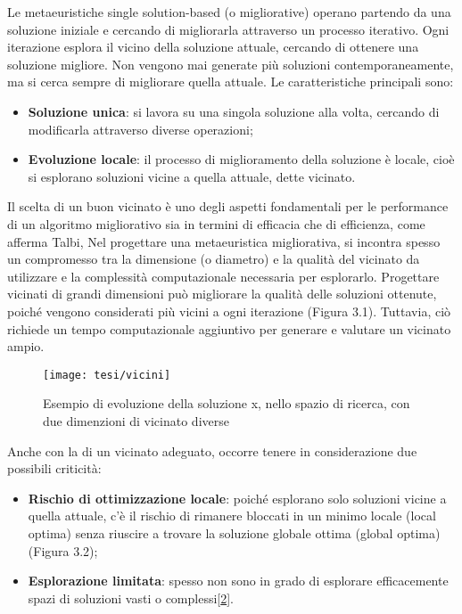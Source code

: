 Le metaeuristiche single solution-based (o migliorative) operano partendo da una soluzione iniziale e cercando di migliorarla attraverso un processo iterativo. Ogni iterazione esplora il vicino della soluzione attuale, cercando di ottenere una soluzione migliore. Non vengono mai generate più soluzioni contemporaneamente, ma si cerca sempre di migliorare quella attuale. Le caratteristiche principali sono:
\begin{itemize}
    \item \textbf{Soluzione unica}: si lavora su una singola soluzione alla volta, cercando di modificarla attraverso diverse operazioni;
    \item \textbf{Evoluzione locale}: il processo di miglioramento della soluzione è locale, cioè si esplorano soluzioni vicine a quella attuale, dette vicinato.
\end{itemize}

Il scelta di un buon vicinato è uno degli aspetti fondamentali per le performance di un algoritmo migliorativo sia in termini di efficacia che di efficienza, come afferma Talbi, Nel progettare una metaeuristica migliorativa, si incontra spesso un compromesso tra la dimensione (o diametro) e la qualità del vicinato da utilizzare e la complessità computazionale necessaria per esplorarlo. Progettare vicinati di grandi dimensioni può migliorare la qualità delle soluzioni ottenute, poiché vengono considerati più vicini a ogni iterazione (Figura 3.1). Tuttavia, ciò richiede un tempo computazionale aggiuntivo per generare e valutare un vicinato ampio.
\begin{figure}[!ht] 
    \centering 
    \texttt{[image: tesi/vicini]} 
    \caption{Esempio di evoluzione della soluzione x, nello spazio di ricerca, con due dimenzioni di vicinato diverse}
\end{figure}

Anche con la di un vicinato adeguato, occorre tenere in considerazione due possibili criticità:
\begin{itemize}
    \item \textbf{Rischio di ottimizzazione locale}: poiché esplorano solo soluzioni vicine a quella attuale, c'è il rischio di rimanere bloccati in un minimo locale (local optima) senza riuscire a trovare la soluzione globale ottima (global optima) (Figura 3.2);
    \item \textbf{Esplorazione limitata}: spesso non sono in grado di esplorare efficacemente spazi di soluzioni vasti o complessi[\hyperlink{bibliografia}{2}].
\end{itemize}

